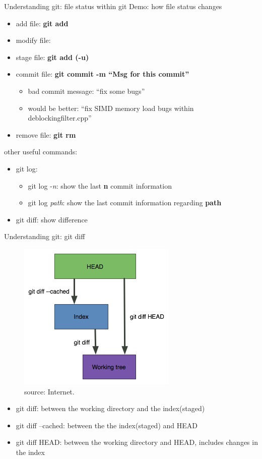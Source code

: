\documentclass{beamer}
\begin{document}
\begin{frame}{Understanding git: file status within git}
    Demo: how file status changes
    \begin{itemize}
     \item    add file: \textbf{git add          }
     \item modify file: \textbf{                 }
     \item  stage file: \textbf{git add (-u)     }
     \item commit file: \textbf{git commit -m ``Msg for this commit''}
     \begin{itemize}
        \item bad commit message: ``fix some bugs''
        \item would be better: ``fix SIMD memory load bugs within deblockingfilter.cpp''
     \end{itemize}
     \item remove file: \textbf{git rm       }
    \end{itemize}
    other useful commands: 
     \begin{itemize}
        \item git log:
	      \begin{itemize}
	       \item git log -\textit{n}: show the last \textbf{n} commit information
	       \item git log \textit{path}: show the last commit information regarding \textbf{path}
	      \end{itemize}
	\item git diff: show difference 	
     \end{itemize}    
\end{frame}

\begin{frame}{Understanding git: git diff}
    \begin{figure}
    \includegraphics[width=.5\textwidth]{figures/GitDiffSimple.png}
    \caption{\label{git diff} source: Internet.}
    \end{figure}             
    \begin{itemize}
     \item    git diff: between the working directory and the index(staged)
     \item    git diff --cached: between the the index(staged) and HEAD
     \item    git diff HEAD: between the working directory and HEAD, includes changes in the index
    \end{itemize}
\end{frame}
\end{document}
